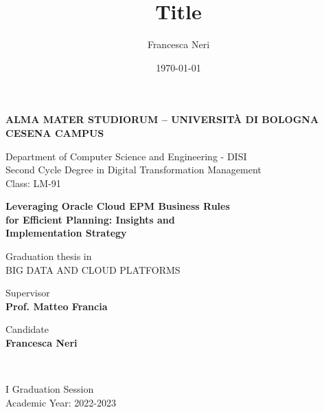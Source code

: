 \title{Title}
\author{Francesca Neri}
\date{\today}

\begin{titlepage}
	\begin{center}
		
		\large
		\textbf{ALMA MATER STUDIORUM -- UNIVERSITÀ DI BOLOGNA \\ CESENA CAMPUS}
		\\
		\noindent\hrulefill
		\vspace{0.4cm}
		
		Department of Computer Science and Engineering - DISI \\
            \vspace{0.1cm}
		Second Cycle Degree in Digital Transformation Management \\
            \vspace{0.1cm}
            Class: LM-91
		
		\Large
		\vspace{4cm}
		\textbf{
            Leveraging Oracle Cloud EPM Business Rules \\
            for Efficient Planning: Insights and \\
            Implementation Strategy
		}
		
		\large
		\vspace{2cm}
		Graduation thesis in \\
		\vspace{0.2cm}
		\textsc{BIG DATA AND CLOUD PLATFORMS}
		
		\vspace{5.5cm}
		\begin{minipage}[t]{0.64\textwidth}
			\begin{flushleft}
				Supervisor \\
				\vspace{0.2cm}
				\textbf{Prof. Matteo Francia}
			\end{flushleft}
		\end{minipage}
		\begin{minipage}[t]{0.34\textwidth}
			\begin{flushright}
				Candidate \\
				\vspace{0.2cm}
				\textbf{Francesca Neri}
			\end{flushright}
		\end{minipage}\\
		
		\vfill
		\noindent\hrulefill
		\vspace{0.3cm}
		\large
		
		I Graduation Session
		\\
		Academic Year: 2022-2023
	\end{center}
\end{titlepage}
\restoregeometry
